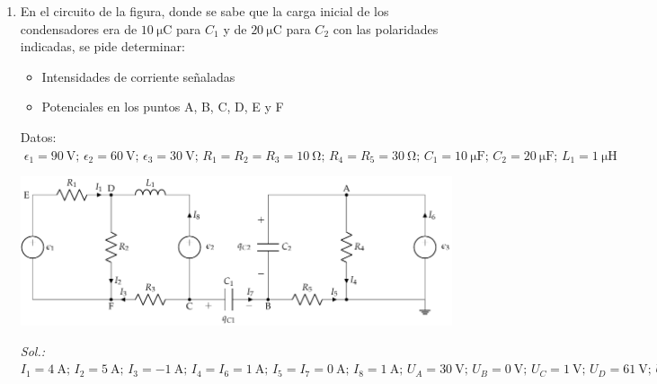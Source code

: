 \begin{enumerate}
  \emph{Sol.:\;
    $U_A=\qty{15}{\volt};\, U_B=\qty{11}{\volt};\, U_C=U_D=\qty{0}{\volt};\, I_1=I_6=\qty{0}{\ampere};\, I_2=I_4=\qty{-1}{\ampere};\, I_3=I_5=\qty{1}{\ampere};\,
    q_1=\qty{9}{\micro\coulomb};\, q_2=\qty{30}{\micro\coulomb};\, q_3=\qty{33}{\micro\coulomb};\, E_{C1}=\qty{40.5}{\micro\joule};\,
    E_{C2}=\qty{225}{\micro\joule};\, E_{C2}=\qty{181.5}{\micro\joule}$}


\item En el circuito de la figura, donde se sabe
  que la carga inicial de los condensadores era de
  $\qty{10}{\micro\coulomb}$ para $C_1$ y de
  $\qty{20}{\micro\coulomb}$ para $C_2$ con las polaridades indicadas,
  se pide determinar:
  \begin{itemize}
  \item Intensidades de corriente señaladas
  \item Potenciales en los puntos A, B, C, D, E y F
  \end{itemize}

  Datos:
  $\;\epsilon_1=\SI{90}{\volt};\, \epsilon_2=\SI{60}{\volt};\,
  \epsilon_3=\SI{30}{\volt};\, R_{1}= R_2 = R_3 =
  \SI{10}{\ohm};\, R_{4}= R_5 = \SI{30}{\ohm};\, C_{1}=
  \SI{10}{\micro\farad};\, C_{2}= \SI{20}{\micro\farad};\, L_1 =
  \SI{1}{\micro\henry}$

  \begin{center}
    \includegraphics[scale = 0.9]{../figs/mallas_carga_inicial.pdf}
  \end{center}

\emph{Sol.:\;
  $I_1=\qty{4}{\ampere};\, I_2=\qty{5}{\ampere};\, I_3=\qty{-1}{\ampere};\, I_4=I_6=\qty{1}{\ampere};\, I_5=I_7=\qty{0}{\ampere};\, I_8=\qty{1}{\ampere};\, U_A=\qty{30}{\volt};\, U_B=\qty{0}{\volt};\,
  U_C=\qty{1}{\volt};\, U_D=\qty{61}{\volt};\, U_E=\qty{101}{\volt};\, U_F=\qty{11}{\volt};\,$}



\end{enumerate}
